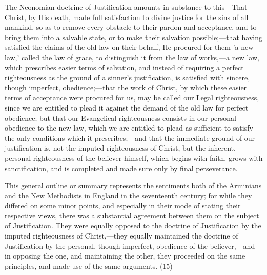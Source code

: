 \documentclass[
]{book}
\begin{document}
The Neonomian doctrine of Justification amounts in substance to this---That Christ, by His death, made full satisfaction to divine justice for the sins of all mankind, so as to remove every obstacle to their pardon and acceptance, and to bring them into a salvable state, or to make their salvation possible;---that having satisfied the claims of the old law on their behalf, He procured for them 'a new law,' called the law of grace, to distinguish it from the law of works,---a new law, which prescribes easier terms of salvation, and instead of requiring a perfect righteousness as the ground of a sinner's justification, is satisfied with sincere, though imperfect, obedience;---that the work of Christ, by which these easier terms of acceptance were procured for us, may be called our Legal righteousness, since we are entitled to plead it against the demand of the old law for perfect obedience; but that our Evangelical righteousness consists in our personal obedience to the new law, which we are entitled to plead as sufficient to satisfy the only conditions which it prescribes;---and that the immediate ground of our justification is, not the imputed righteousness of Christ, but the inherent, personal righteousness of the believer himself, which begins with faith, grows with sanctification, and is completed and made sure only by final perseverance.

This general outline or summary represents the sentiments both of the Arminians and the New Methodists in England in the seventeenth century; for while they differed on some minor points, and especially in their mode of stating their respective views, there was a substantial agreement between them on the subject of Justification. They were equally opposed to the doctrine of Justification by the imputed righteousness of Christ,---they equally maintained the doctrine of Justification by the personal, though imperfect, obedience of the believer,---and in opposing the one, and maintaining the other, they proceeded on the same principles, and made use of the same arguments. (15)
\end{document}
